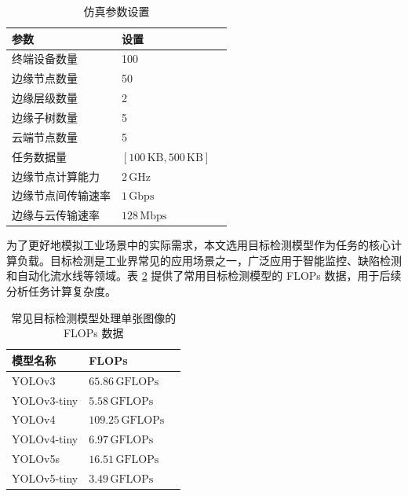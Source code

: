 \begin{table}[ht]
    \renewcommand{\arraystretch}{1.5}
    \centering
    \caption{仿真参数设置}
    \label{tab:simulation-parameters}
    \begin{tabular}{lll}
        \toprule
        \textbf{参数} & \textbf{设置} \\
        \midrule
        终端设备数量 & 100 \\
        边缘节点数量 & 50 \\
        边缘层级数量 & 2 \\
        边缘子树数量 & 5 \\
        云端节点数量 & 5 \\
        任务数据量 & $[100 \, \text{KB}, 500 \, \text{KB}]$ \\
        边缘节点计算能力 & $2 \, \text{GHz}$ \\
        边缘节点间传输速率 & $1 \, \text{Gbps}$ \\
        边缘与云传输速率 & $128 \, \text{Mbps}$ \\
        \bottomrule
    \end{tabular}
\end{table}

为了更好地模拟工业场景中的实际需求，本文选用目标检测模型作为任务的核心计算负载。目标检测是工业界常见的应用场景之一，广泛应用于智能监控、缺陷检测和自动化流水线等领域。表 \ref{tab:model-flops} 提供了常用目标检测模型的 FLOPs 数据，用于后续分析任务计算复杂度。

\begin{table}[ht]
    \renewcommand{\arraystretch}{1.5}
    \centering
    \caption{常见目标检测模型处理单张图像的 FLOPs 数据}
    \label{tab:model-flops}
    \begin{tabular}{lll}
        \toprule
        \textbf{模型名称} & \textbf{FLOPs} \\
        \midrule
        YOLOv3\cite{redmon2018yolov3} & $65.86 \, \text{GFLOPs}$ \\
        YOLOv3-tiny & $5.58 \, \text{GFLOPs}$ \\
        YOLOv4\cite{wang2021scaled} & $109.25 \, \text{GFLOPs}$ \\
        YOLOv4-tiny\cite{gu2022novel} & $6.97 \, \text{GFLOPs}$ \\
        YOLOv5s & $16.51 \, \text{GFLOPs}$ \\
        YOLOv5-tiny & $3.49 \, \text{GFLOPs}$ \\
        \bottomrule
    \end{tabular}
\end{table}

